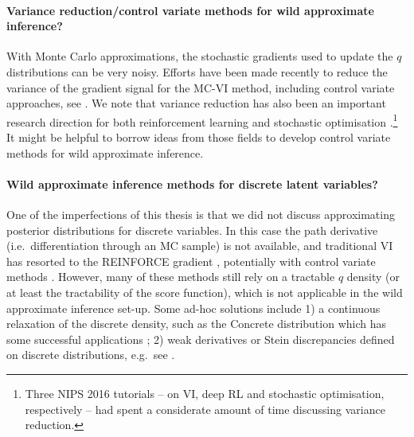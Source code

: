 \paragraph{Variance reduction/control variate methods for wild approximate inference? \\}
With Monte Carlo approximations, the stochastic gradients used to update the $q$ distributions can be very noisy. Efforts have been made recently to reduce the variance of the gradient signal for the MC-VI method, including control variate approaches, see \citet{paisley:bbvi2012, mnih:nvil2014, gu:muprop2016}. We note that variance reduction has also been an important research direction for both reinforcement learning \citep{greensmith:rl_variance2004, gu:qprop2017} and stochastic optimisation \citep{leroux:sag2012, johnson:svrg2013, defazio:saga2014}.\footnote{Three NIPS 2016 tutorials -- on VI, deep RL and stochastic optimisation, respectively -- had spent a considerate amount of time discussing variance reduction.} It might be helpful to borrow ideas from those fields to develop control variate methods for wild approximate inference.

\paragraph{Wild approximate inference methods for discrete latent variables?\\}
One of the imperfections of this thesis is that we did not discuss approximating posterior distributions for discrete variables. In this case the path derivative (i.e.~differentiation through an MC sample) is not available, and traditional VI has resorted to the REINFORCE gradient \citep{williams:reinforce1992}, potentially with control variate methods \citep{mnih:nvil2014, titsias:local_expectation2015, gu:muprop2016, mnih:vimco2016}. However, many of these methods still rely on a tractable $q$ density (or at least the tractability of the score function), which is not applicable in the wild approximate inference set-up. Some ad-hoc solutions include 1) a continuous relaxation of the discrete density, such as the Concrete distribution \citep{maddison:concrete2017, jang:gumble2017} which has some successful applications \citep{kusner:gan_gumbel2016, gal:concrete2017}; 2) weak derivatives or Stein discrepancies defined on discrete distributions, e.g.~see \citet{ranganath:ovi2016}.

